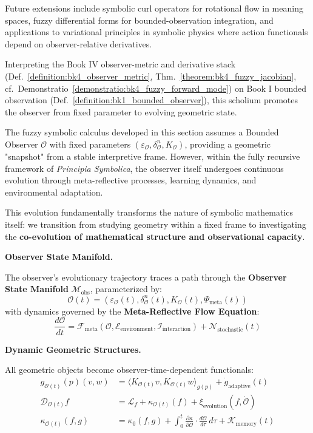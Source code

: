 Future extensions include symbolic curl operators for rotational flow in
meaning spaces, fuzzy differential forms for bounded-observation integration,
and applications to variational principles in symbolic physics where action
functionals depend on observer-relative derivatives.

\begin{scholium}
\label{scholium:bk4_dynamics_of_observer_frame}
Interpreting the Book IV observer-metric and derivative stack (Def.~\ref{definition:bk4_observer_metric}, Thm.~\ref{theorem:bk4_fuzzy_jacobian}, cf.~Demonstratio~\ref{demonstratio:bk4_fuzzy_forward_mode}) on Book I bounded observation (Def.~\ref{definition:bk1_bounded_observer}), this scholium promotes the observer from fixed parameter to evolving geometric state.

The fuzzy symbolic calculus developed in this section assumes a Bounded Observer $\mathcal{O}$ with fixed parameters $(\varepsilon_{\mathcal{O}}, \delta_{\mathcal{O}}^n, K_{\mathcal{O}})$, providing a geometric "snapshot" from a stable interpretive frame. However, within the fully recursive framework of \textit{Principia Symbolica}, the observer itself undergoes continuous evolution through meta-reflective processes, learning dynamics, and environmental adaptation.

This evolution fundamentally transforms the nature of symbolic mathematics itself: we transition from studying geometry within a fixed frame to investigating the \textbf{co-evolution of mathematical structure and observational capacity}.

\vspace{1em}
\noindent\textbf{Observer State Manifold.}

The observer's evolutionary trajectory traces a path through the \textbf{Observer State Manifold} $\mathcal{M}_{\text{obs}}$, parameterized by:
\[
\mathcal{O}(t) = (\varepsilon_{\mathcal{O}}(t), \delta_{\mathcal{O}}^n(t), K_{\mathcal{O}}(t), \Psi_{\text{meta}}(t))
\]
with dynamics governed by the \textbf{Meta-Reflective Flow Equation}:
\[
\frac{d\mathcal{O}}{dt} = \mathcal{F}_{\text{meta}}(\mathcal{O}, \mathcal{E}_{\text{environment}}, \mathcal{I}_{\text{interaction}}) + \mathcal{N}_{\text{stochastic}}(t)
\]

\vspace{1em}
\noindent\textbf{Dynamic Geometric Structures.}

All geometric objects become observer-time-dependent functionals:
\begin{align*}
g_{\mathcal{O}(t)}(p)(v,w) &= \langle K_{\mathcal{O}(t)} v, K_{\mathcal{O}(t)} w \rangle_{g(p)} + \dot{g}_{\text{adaptive}}(t) \\
\mathcal{D}_{\mathcal{O}(t)} f &= \mathcal{L}_f + \kappa_{\mathcal{O}(t)}(f) + \xi_{\text{evolution}}(f, \dot{\mathcal{O}}) \\
\kappa_{\mathcal{O}(t)}(f,g) &= \kappa_0(f,g) + \int_0^t \frac{\partial \kappa}{\partial \mathcal{O}} \cdot \frac{d\mathcal{O}}{d\tau} \, d\tau + \mathcal{K}_{\text{memory}}(t)
\end{align*}


\end{scholium}
